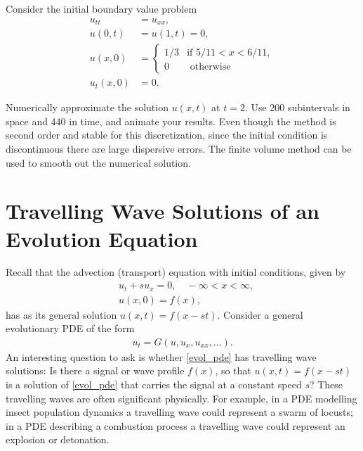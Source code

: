 \begin{problem}
	Consider the initial boundary value problem 
	\begin{align*}
		u_{tt} &= u_{xx}, \\
		u(0,t) &= u(1,t) = 0, \\
		u(x,0) &= \begin{cases} 1/3 & \text{if } 5/11 < x < 6/11,\\
		0 & \text{ otherwise}
		\end{cases}\\ 
		u_t(x,0) &= 0.
	\end{align*}

	Numerically approximate the solution $u(x,t)$ at $t = 2$.  Use 200 subintervals in space and 440 in time, and animate your results.  Even though the method is second order and stable for this discretization, since the initial condition is discontinuous there are large dispersive errors.  The finite volume method can be used to smooth out the numerical solution. 
\end{problem}




\section{Travelling Wave Solutions of an Evolution Equation}
Recall that the advection (transport) equation with initial conditions, given by
\begin{align*}
	&{ }u_t + su_x  = 0, \quad -\infty < x < \infty, \\
	&{ }u(x,0) = f(x),
\end{align*}
has as its general solution $u(x,t) = f(x -st)$.
Consider a general evolutionary PDE of the form 
\begin{align}
u_t = G(u,u_x, u_{xx}, \ldots). \label{evol_pde}
\end{align}
An interesting question to ask is whether \eqref{evol_pde} has travelling wave solutions: Is there a signal or wave profile $f(x)$, so that $u(x,t) = f(x-st)$ is a solution of \eqref{evol_pde} that carries the signal at a constant speed $s$?  These travelling waves are often significant physically.  For example, in a PDE modelling insect population dynamics a travelling wave could represent a swarm of locusts; in a PDE describing a combustion process a travelling wave could represent an explosion or detonation. 


% 
% 

